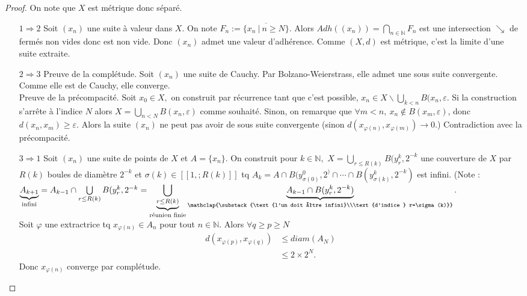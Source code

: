 \begin{proof}
    On note que $X$ est métrique donc séparé.
    \begin{itemize}
    \item[$1\Rightarrow 2$] Soit $(x_n)$ une suite à valeur dans $X.$ On note $F_n:=\overline{\{x_n\ |\ n\ge N\}} $.
    Alors $Adh((x_n))=\bigcap\limits_{n\in \mathbb{N} } F_n$ est une intersection $\searrow$ de fermés non vides donc est non vide. 
        Donc $(x_{n})$ admet une valeur d'adhérence. 
        Comme $(X,d)$ est métrique, c'est la limite d'une suite extraite.
    \item[ $2\Rightarrow 3$] Preuve de la complétude. Soit $(x_{n})$ une suite de Cauchy. Par Bolzano-Weierstrass, elle admet une sous suite convergente. Comme elle est de Cauchy, elle converge.\\
        Preuve de la précompacité. Soit $x_0\in X,$ on construit par récurrence tant que c'est possible, $x_{n}\in X\backslash \bigcup\limits_{k<n} B(x_{n},\varepsilon $. Si la construction s'arrête à l'indice $N$ alors $X=\bigcup\limits_{n<N} B(x_{n},\varepsilon )$ comme souhaité. Sinon, on remarque que $\forall m<n,\ x_{n}\not\in B(x_m,\varepsilon ) $, donc $d(x_{n},x_m)\ge \varepsilon .$ Alors la suite $(x_{n})$ ne peut pas avoir de sous suite convergente (sinon $d(x _{\varphi (n)},x_{\varphi (m)})\to 0.$) Contradiction avec la précompacité.
    \item[$3\Rightarrow 1$] Soit $(x_{n})$ une suite de points de $X$ et $A=\{x_{n}\} $. On construit pour  $k\in \mathbb{N} ,$ $X=\bigcup\limits_{r\le R(k)} B(y_r^k,2^{-k}$ une couverture de $X$ par $R(k)$ boules de diamètre $2^{-k}$ et $\sigma(k)\in [\![1,;R(k)]\!]$ tq $A_k=A\cap B(y^0_{\sigma(0)},2^ ) \cap \cdots\cap B(y^k_{\sigma(k)},2^{-k})$ est infini. (Note : $\underbrace{A_{k+1}}_{\text{infini}}=A_{k-1}\cap \bigcup\limits_{r\le R(k)} B(y^k_r,2^{-k}=\underbrace{\bigcup\limits_{r\le R(k)}}_{\text{réunion finie}}\underbrace{A_{k-1}\cap B(y^k_r, 2^{-k})}_{\mathclap{\substack{\text{l'un doit être infini}\\\text{d'indice } r=\sigma(k)}}} $.\\
        Soit $\varphi $ une extractrice tq $x_{\varphi (n)}\in A_n$ pour tout $n\in \mathbb{N} .$ Alors $\forall q\ge p\ge N$
        \begin{align*}
            d(x_{\varphi (p)},x_{\varphi (q)}) &\le diam(A_N)\\
                                               &\le 2\times 2^N.
        \end{align*}
        Donc $x_{\varphi (n)}$ converge par complétude.

\end{itemize}
\end{proof}
